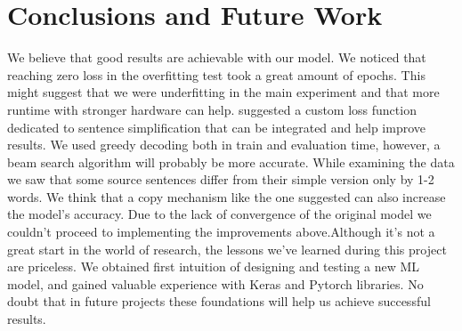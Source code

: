 \documentclass{article}
\begin{document}
\section{Conclusions and Future Work}
We believe that good results are achievable with our model. We noticed that reaching zero loss in the overfitting test took a great amount of epochs. This might suggest that we were underfitting in the main experiment and that more runtime with stronger hardware can help. \cite{kriz2019complexity} suggested a custom loss function dedicated to sentence simplification that can be integrated and help improve results. We used greedy decoding both in train and evaluation time, however, a beam search algorithm will probably be more accurate. While examining the data we saw that some source sentences differ from their simple version only by 1-2 words. We think that a copy mechanism like the one \cite{mathews2018simplifying} suggested can also increase the model’s accuracy. Due to the lack of convergence of the original model we couldn’t proceed to implementing the improvements above.\linebreak Although it's not a great start in the world of research, the lessons we've learned during this project are priceless. We obtained first intuition of designing and testing a new ML model, and gained valuable experience with Keras and Pytorch libraries. No doubt that in future projects these foundations will help us achieve successful results.

\nocite{*}


\end{document}
